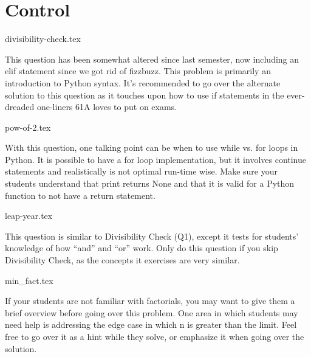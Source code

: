 \documentclass{exam}
\begin{document}
\section{Control}
\begin{questions}
{divisibility-check.tex}
\begin{questionmeta}
  This question has been somewhat altered since last semester, now including an elif statement since we got rid of fizzbuzz. This problem is primarily an introduction to Python syntax.
  It's recommended to go over the alternate solution to this question as it touches upon how to use if statements in the ever-dreaded one-liners 61A loves to put on exams. 
\end{questionmeta}
{pow-of-2.tex}
\begin{questionmeta}
  With this question, one talking point can be when to use while vs. for loops in Python. It is possible to have a for loop implementation, but it involves continue statements and realistically is not optimal run-time wise.
  Make sure your students understand that print returns None and that it is valid for a Python function to not have a return statement.
\end{questionmeta}
{leap-year.tex}
\begin{questionmeta}
  This question is similar to Divisibility Check (Q1), except it tests for students' knowledge of how ``and'' and ``or'' work.
  Only do this question if you skip Divisibility Check, as the concepts it exercises are very similar.
\end{questionmeta}
{min_fact.tex}
\begin{questionmeta}
  If your students are not familiar with factorials, you may want to give them a brief overview before going over this problem.
  One area in which students may need help is addressing the edge case in which n is greater than the limit. Feel free to go over it as a hint while they solve, or emphasize it when going over the solution.
\end{questionmeta}
\end{questions}
\end{document}
